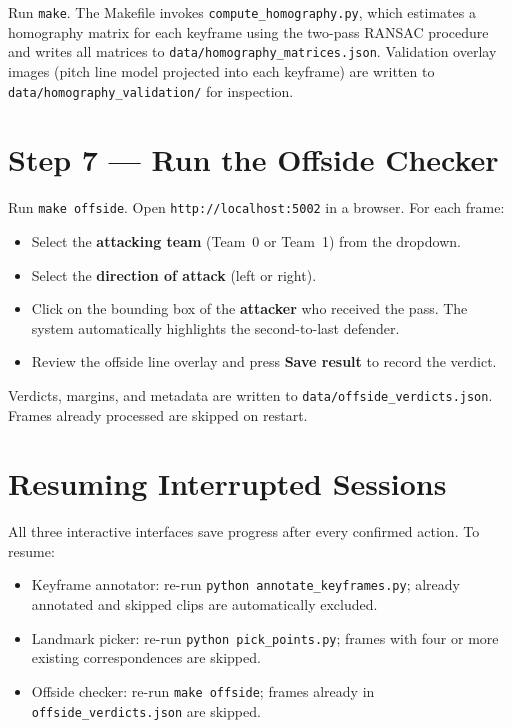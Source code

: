 Run \texttt{make}. The Makefile invokes \texttt{compute\_homography.py}, which estimates a homography matrix for each keyframe using the two-pass RANSAC procedure and writes all matrices to \texttt{data/homography\_matrices.json}. Validation overlay images (pitch line model projected into each keyframe) are written to \texttt{data/homography\_validation/} for inspection.

\section*{Step 7 — Run the Offside Checker}

Run \texttt{make offside}. Open \texttt{http://localhost:5002} in a browser. For each frame:

\begin{itemize}
  \item Select the \textbf{attacking team} (Team~0 or Team~1) from the dropdown.
  \item Select the \textbf{direction of attack} (left or right).
  \item Click on the bounding box of the \textbf{attacker} who received the pass. The system automatically highlights the second-to-last defender.
  \item Review the offside line overlay and press \textbf{Save result} to record the verdict.
\end{itemize}

Verdicts, margins, and metadata are written to \texttt{data/offside\_verdicts.json}. Frames already processed are skipped on restart.

\section*{Resuming Interrupted Sessions}

All three interactive interfaces save progress after every confirmed action. To resume:
\begin{itemize}
  \item Keyframe annotator: re-run \texttt{python annotate\_keyframes.py}; already annotated and skipped clips are automatically excluded.
  \item Landmark picker: re-run \texttt{python pick\_points.py}; frames with four or more existing correspondences are skipped.
  \item Offside checker: re-run \texttt{make offside}; frames already in \texttt{offside\_verdicts.json} are skipped.
\end{itemize}
